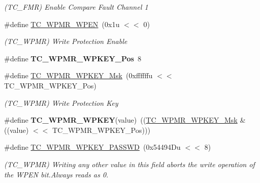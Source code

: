 \begin{DoxyCompactItemize}
\begin{DoxyCompactList}\small\item\em (T\+C\+\_\+\+F\+MR) Enable Compare Fault Channel 1 \end{DoxyCompactList}\item 
\mbox{\label{group__SAMV71__TC_ga8d7a567f57170fe4ba4277910eba2696}} 
\#define \mbox{\hyperlink{group__SAMV71__TC_ga8d7a567f57170fe4ba4277910eba2696}{T\+C\+\_\+\+W\+P\+M\+R\+\_\+\+W\+P\+EN}}~(0x1u $<$$<$ 0)
\begin{DoxyCompactList}\small\item\em (T\+C\+\_\+\+W\+P\+MR) Write Protection Enable \end{DoxyCompactList}\item 
\mbox{\label{group__SAMV71__TC_gaaf064db5e99cb63d2bdef0cf72712e20}} 
\#define {\bfseries T\+C\+\_\+\+W\+P\+M\+R\+\_\+\+W\+P\+K\+E\+Y\+\_\+\+Pos}~8
\item 
\mbox{\label{group__SAMV71__TC_gaa4d7b0a1655bf8ad889ea5eee9918c15}} 
\#define \mbox{\hyperlink{group__SAMV71__TC_gaa4d7b0a1655bf8ad889ea5eee9918c15}{T\+C\+\_\+\+W\+P\+M\+R\+\_\+\+W\+P\+K\+E\+Y\+\_\+\+Msk}}~(0xffffffu $<$$<$ T\+C\+\_\+\+W\+P\+M\+R\+\_\+\+W\+P\+K\+E\+Y\+\_\+\+Pos)
\begin{DoxyCompactList}\small\item\em (T\+C\+\_\+\+W\+P\+MR) Write Protection Key \end{DoxyCompactList}\item 
\mbox{\label{group__SAMV71__TC_gad9651444d0660a932cca46764204160b}} 
\#define {\bfseries T\+C\+\_\+\+W\+P\+M\+R\+\_\+\+W\+P\+K\+EY}(value)~((\mbox{\hyperlink{group__SAMV71__TC_gaa4d7b0a1655bf8ad889ea5eee9918c15}{T\+C\+\_\+\+W\+P\+M\+R\+\_\+\+W\+P\+K\+E\+Y\+\_\+\+Msk}} \& ((value) $<$$<$ T\+C\+\_\+\+W\+P\+M\+R\+\_\+\+W\+P\+K\+E\+Y\+\_\+\+Pos)))
\item 
\mbox{\label{group__SAMV71__TC_ga9ea243bbd57d7aaffd1d7c9d41bffd12}} 
\#define \mbox{\hyperlink{group__SAMV71__TC_ga9ea243bbd57d7aaffd1d7c9d41bffd12}{T\+C\+\_\+\+W\+P\+M\+R\+\_\+\+W\+P\+K\+E\+Y\+\_\+\+P\+A\+S\+S\+WD}}~(0x54494\+Du $<$$<$ 8)
\begin{DoxyCompactList}\small\item\em (T\+C\+\_\+\+W\+P\+MR) Writing any other value in this field aborts the write operation of the W\+P\+EN bit.\+Always reads as 0. \end{DoxyCompactList}\item 

\end{DoxyCompactItemize}
